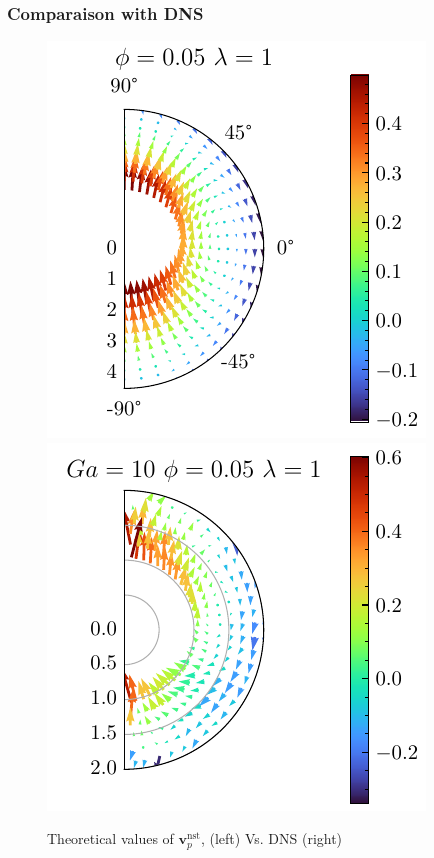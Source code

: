 \documentclass{sintefbeamer}
\begin{document}
\begin{frame}
  \frametitle{Comparaison with DNS}

  \begin{figure}
    \includegraphics[height = 0.4\textwidth]{image/Vnst_p_l_1_5.pdf}
    \includegraphics[height = 0.4\textwidth]{image/HOMOGENEOUS_final/Dist/U_l_1_Ga_10_PHI_5.pdf}
    \caption{Theoretical values of $\textbf{v}_p^\text{nst}$, (left) Vs. DNS (right) }
  \end{figure}
  
\end{frame}
\end{document}
